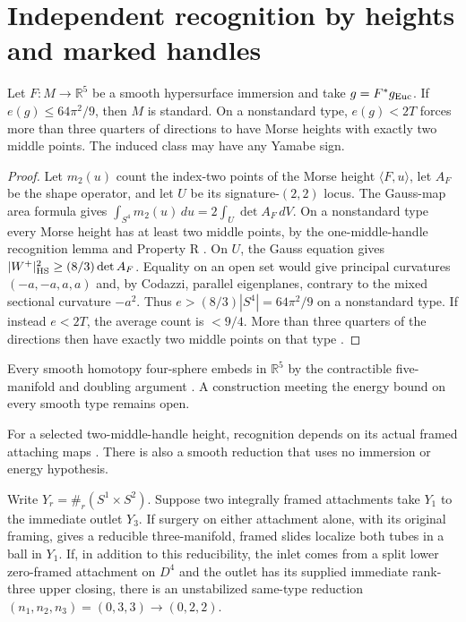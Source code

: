\section{Independent recognition by heights and marked handles}\label{sec:immersion}

\begin{theorem}\label{thm:immersed-entry}
Let \(F:M\to\mathbb R^5\) be a smooth hypersurface immersion and take
\(g=F^*g_{\rm Euc}\). If \(e(g)\le64\pi^2/9\), then \(M\) is
standard. On a nonstandard type, \(e(g)<2T\) forces more than three
quarters of directions to have Morse heights with exactly two middle
points. The induced class may have any Yamabe sign.
\end{theorem}
\begin{proof}
Let \(m_2(u)\) count the index-two points of the Morse height
\(\langle F,u\rangle\), let \(A_F\) be the shape operator, and let \(U\)
be its signature-\((2,2)\) locus. The Gauss-map area formula gives
\(\int_{S^4}m_2(u)\,du=2\int_U\det A_F\,dV\). On a nonstandard type
every Morse height has at least two middle points, by the one-middle-handle
recognition lemma and Property R \cite{Gabai1987FoliationsIII,Baker2026ImmersionEnergy}.
On \(U\), the Gauss equation gives
\(|W^+|_{\rm HS}^2\ge(8/3)\det A_F\). Equality on an open set would
give principal curvatures \((-a,-a,a,a)\) and, by Codazzi, parallel
eigenplanes, contrary to the mixed sectional curvature \(-a^2\).
Thus \(e>(8/3)|S^4|=64\pi^2/9\) on a nonstandard type. If instead
\(e<2T\), the average count is \(<9/4\). More than three quarters of
the directions then have exactly two middle points on that type
\cite[Heights and smooth recognition]{Baker2026ImmersionEnergy}.
\end{proof}
Every smooth homotopy four-sphere embeds in \(\mathbb R^5\) by the
contractible five-manifold and doubling argument
\cite[Theorem 3]{Kervaire1969HomologySpheres}\cite{KervaireMilnor1963Groups}.
A construction meeting the energy bound on every smooth type remains open.

For a selected two-middle-handle height, recognition depends on its
actual framed attaching maps \cite{Baker2026MarkedHeights}. There is
also a smooth reduction that uses no immersion or energy hypothesis.

\begin{proposition}\label{prop:native-cut}
Write \(Y_r=\#_r(S^1\times S^2)\). Suppose two integrally framed
attachments take \(Y_1\) to the immediate outlet \(Y_3\). If surgery on
either attachment alone, with its original framing, gives a reducible
three-manifold, framed slides localize both tubes in a ball in \(Y_1\).
If, in addition to this reducibility, the inlet comes from a split lower zero-framed attachment on \(D^4\)
and the outlet has its supplied immediate rank-three upper closing,
there is an unstabilized same-type reduction
\((n_1,n_2,n_3)=(0,3,3)\longrightarrow(0,2,2)\).
\end{proposition}

